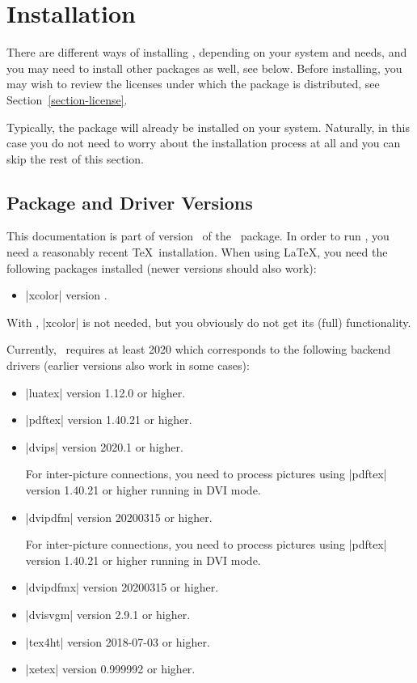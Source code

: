 %
%
%


\section{Installation}

There are different ways of installing \pgfname, depending on your system and
needs, and you may need to install other packages as well, see below. Before
installing, you may wish to review the licenses under which the package is
distributed, see Section~\ref{section-license}.

Typically, the package will already be installed on your system. Naturally, in
this case you do not need to worry about the installation process at all and
you can skip the rest of this section.


\subsection{Package and Driver Versions}

This documentation is part of version \pgfversion\ of the \pgfname\ package. In
order to run \pgfname, you need a reasonably recent \TeX\ installation. When
using \LaTeX, you need the following packages installed (newer versions should
also work):
%
\begin{itemize}
    \item |xcolor| version \xcolorversion.
\end{itemize}
%
With , |xcolor| is not needed, but you obviously do not get its
(full) functionality.

Currently, \pgfname\ requires at least  2020 which corresponds to the
following backend drivers (earlier versions also work in some cases):
%
\begin{itemize}
    \item |luatex| version 1.12.0 or higher.
    \item |pdftex| version 1.40.21 or higher.
    \item |dvips| version 2020.1 or higher.

        For inter-picture connections, you need to process pictures using
        |pdftex| version 1.40.21 or higher running in DVI mode.
    \item |dvipdfm| version 20200315 or higher.

        For inter-picture connections, you need to process pictures using
        |pdftex| version 1.40.21 or higher running in DVI mode.
    \item |dvipdfmx| version 20200315 or higher.
    \item |dvisvgm| version 2.9.1 or higher.
    \item |tex4ht| version 2018-07-03 or higher.
    \item |xetex| version 0.999992 or higher.
\end{itemize}

